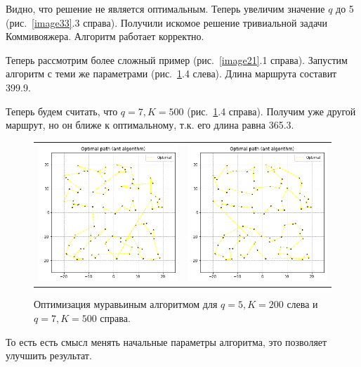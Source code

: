\documentclass[12pt, a4paper]{article}
\begin{document}
    Видно, что решение не является оптимальным. Теперь увеличим значение $q$ 
    до 5 (рис.~\ref{image33}.3 справа). Получили искомое решение тривиальной 
    задачи Коммивояжера. Алгоритм работает корректно.
    
    Теперь рассмотрим более сложный пример (рис.~\ref{image21}.1 справа). 
    Запустим алгоритм с теми же параметрами (рис.~\ref{image34}.4 слева). 
    Длина маршрута составит 399.9.
    
    Теперь будем считать, что $q = 7, K = 500$ (рис.~\ref{image34}.4 
    справа). Получим уже другой маршрут, но он ближе к оптимальному, т.к. 
    его длина равна 365.3.
    
    \begin{figure}[h!]
        \center
        \begin{tabular}{cc}
            \includegraphics[width = 6cm]{dots2_2_1.png} &
            \includegraphics[width = 6cm]{dots2_2_2.png} \\
        \end{tabular}
        \label{image34}
        \caption{Оптимизация муравьиным алгоритмом для $q = 5, K = 200$ 
            слева и $q = 7, K = 500$ справа.}
    \end{figure}
    
    То есть есть смысл менять начальные параметры алгоритма, это позволяет улучшить результат.
    
\end{document}
